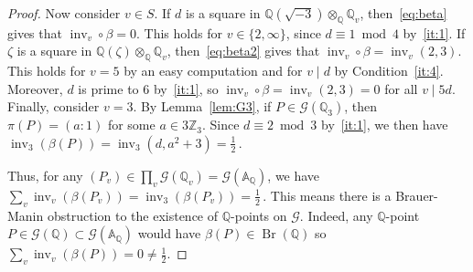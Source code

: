 \documentclass[12pt, reqno]{amsart}
\theoremstyle{definition}
\newcommand{\A}{{\mathbb A}}
\newcommand{\Q}{{\mathbb Q}}
\newcommand{\Z}{{\mathbb Z}}
\newcommand{\calG}{{\mathcal G}}
\DeclareMathOperator{\inv}{inv}
\DeclareMathOperator{\Br}{Br}
\begin{document}
\begin{proof}
Now consider \(v\in S\). If \(d\) is a square in \(\Q(\sqrt{-3})\otimes_{\Q} \Q_v\), then~\eqref{eq:beta} gives that $\inv_v\circ \beta = 0$. This holds for $v \in \{2,\infty\}$, since \(d\equiv 1 \bmod 4\) by~\eqref{it:1}. If \(\zeta\) is a square in \(\Q(\zeta)\otimes_{\Q} \Q_v\), then~\eqref{eq:beta2} gives that $\inv_v\circ \beta = \inv_v(2,3)$. This holds for $v = 5$ by an easy computation and for $v \mid d$ by Condition~\eqref{it:4}. Moreover, $d$ is prime to $6$ by~\eqref{it:1}, so $\inv_v\circ \beta = \inv_v(2,3) = 0$ for all $v \mid 5d$.
Finally, consider $v = 3$. By Lemma~\ref{lem:G3}, if $P \in \calG(\Q_3)$, then $\pi(P) = (a:1)$ for some \(a\in3\Z_3\). Since $d \equiv 2 \bmod 3$ by~\eqref{it:1}, we then have
\(
	\inv_3(\beta(P)) = \inv_3(d,a^2 + 3) = \frac12\,.
\)


Thus, for any $(P_v) \in \prod_v \calG(\Q_v) = \calG(\A_\Q)$, we have
\(
	\sum_v \inv_v(\beta(P_v)) = \inv_3(\beta(P_v)) = \frac12\,.
\)
This means there is a Brauer-Manin obstruction to the existence of $\Q$-points on $\calG$. Indeed, any $\Q$-point $P \in \calG(\Q) \subset \calG(\A_\Q)$ would have $\beta(P) \in \Br(\Q)$ so $\sum_v\inv_v(\beta(P)) = 0 \neq \frac12$.
   \end{proof}


\end{document}
